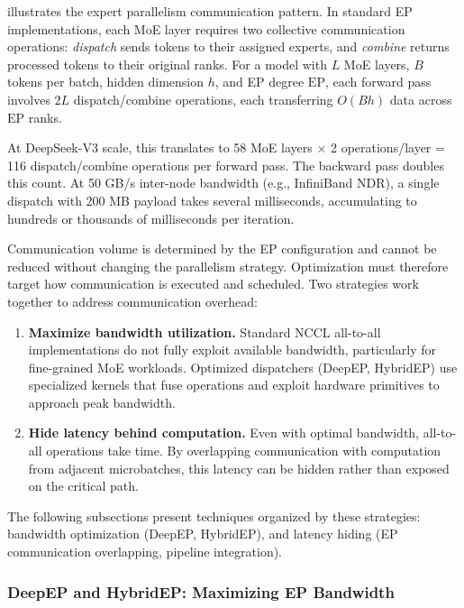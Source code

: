  illustrates the expert parallelism communication pattern. In standard EP implementations, each MoE layer requires two collective communication operations: \textit{dispatch} sends tokens to their assigned experts, and \textit{combine} returns processed tokens to their original ranks. For a model with $L$ MoE layers, $B$ tokens per batch, hidden dimension $h$, and EP degree $\text{EP}$, each forward pass involves $2L$ dispatch/combine operations, each transferring $O(Bh)$ data across $\text{EP}$ ranks.

At DeepSeek-V3 scale, this translates to 58 MoE layers $\times$ 2 operations/layer = 116 dispatch/combine operations per forward pass. The backward pass doubles this count. At 50 GB/s inter-node bandwidth (e.g., InfiniBand NDR), a single dispatch with 200 MB payload takes several milliseconds, accumulating to hundreds or thousands of milliseconds per iteration.

Communication volume is determined by the EP configuration and cannot be reduced without changing the parallelism strategy. Optimization must therefore target how communication is executed and scheduled. Two strategies work together to address communication overhead:

\begin{enumerate}
    \item \textbf{Maximize bandwidth utilization.} Standard NCCL all-to-all implementations do not fully exploit available bandwidth, particularly for fine-grained MoE workloads. Optimized dispatchers (DeepEP, HybridEP) use specialized kernels that fuse operations and exploit hardware primitives to approach peak bandwidth.
    \item \textbf{Hide latency behind computation.} Even with optimal bandwidth, all-to-all operations take time. By overlapping communication with computation from adjacent microbatches, this latency can be hidden rather than exposed on the critical path.
\end{enumerate}

The following subsections present techniques organized by these strategies: bandwidth optimization (DeepEP, HybridEP), and latency hiding (EP communication overlapping, pipeline integration).

\subsubsection{DeepEP and HybridEP: Maximizing EP Bandwidth}\label{sec:deepep}

